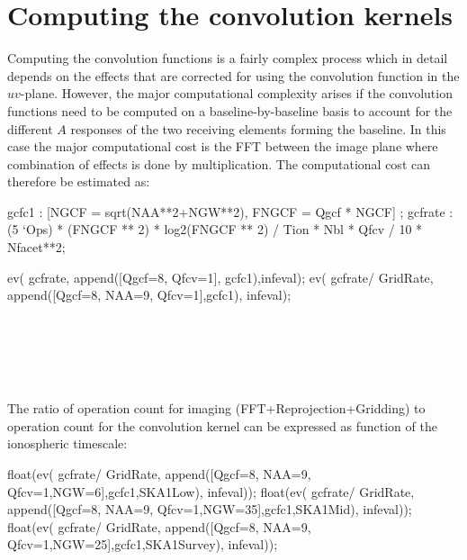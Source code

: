 \documentclass[useAMS,usenatbib,referee]{article}
\begin{document}
\section{Computing the convolution kernels}

Computing the convolution functions is a fairly complex process which
in detail depends on the effects that are corrected for using the
convolution function in the $uv$-plane. However, the major
computational complexity arises if the convolution functions need to
be computed on a baseline-by-baseline basis to account for the
different $A$ responses of the two receiving elements forming the
baseline.  In this case the major computational cost is the FFT
between the image plane where combination of effects is done by
multiplication.  The computational cost can therefore be estimated as:

\begin{maxima}[]
gcfc1 : [NGCF = sqrt(NAA**2+NGW**2),
         FNGCF = Qgcf * NGCF] ;
gcfrate : (5 `Ops) *  (FNGCF ** 2) * log2(FNGCF ** 2)  / Tion * Nbl *
Qfcv / 10 *
Nfacet**2;

ev( gcfrate, append([Qgcf=8, Qfcv=1], gcfc1),infeval);
ev( gcfrate/ GridRate, append([Qgcf=8, NAA=9, Qfcv=1],gcfc1),
infeval);

\maximaoutput*
\m  \left[ \mathrm{NGCF}=\sqrt{N_{\rm GW}^2+N_{\rm AA}^2} , \mathrm{FNGCF}=\mathrm{Qgcf}\,\mathrm{NGCF} \right] \\
\; \\
\; \\
 \\
\end{maxima}

The ratio of operation count for imaging (FFT+Reprojection+Gridding)
to operation count for the convolution kernel can be expressed as
function of the ionospheric timescale:

\begin{maxima}[]
float(ev( gcfrate/ GridRate, 
          append([Qgcf=8, NAA=9, Qfcv=1,NGW=6],gcfc1,SKA1Low), infeval));
float(ev( gcfrate/ GridRate, 
          append([Qgcf=8, NAA=9, Qfcv=1,NGW=35],gcfc1,SKA1Mid), infeval));
float(ev( gcfrate/ GridRate, 
          append([Qgcf=8, NAA=9, Qfcv=1,NGW=25],gcfc1,SKA1Survey), infeval));
\maximaoutput*
{}\; \\
\; \\
\; \\
\end{maxima}
\end{document}
